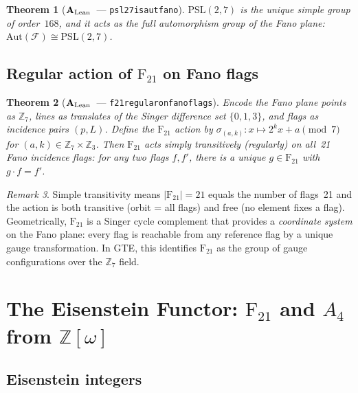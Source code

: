 \documentclass[11pt]{article}
\newtheorem{theorem}{Theorem}[section]
\theoremstyle{remark}
\newtheorem{remark}[theorem]{Remark}
\newcommand{\lean}[1]{%
  \penalty-100
  \begingroup\def\_{\textunderscore\allowbreak}\texttt{#1}\endgroup}
\newcommand{\PSLtwo}{\ensuremath{\mathrm{PSL}(2,7)}}
\newcommand{\FineSeven}{\ensuremath{\mathrm{F}_{21}}}
\newcommand{\Zcyc}[1]{\ensuremath{\mathbb{Z}_{#1}}}
\newcommand{\AltFour}{\ensuremath{A_4}}
\newcommand{\Eisenstein}{\ensuremath{\mathbb{Z}[\omega]}}
\newcommand{\CatAL}{\ensuremath{\textbf{A}_{\rm Lean}}}
\begin{document}
\begin{theorem}[\CatAL\ --- \lean{psl27\_is\_aut\_fano}]
\label{thm:psl_aut}
$\PSLtwo$ is the unique simple group of order~$168$, and it acts as the full
automorphism group of the Fano plane: $\mathrm{Aut}(\mathcal{F}) \cong \PSLtwo$.
\end{theorem}

\subsection{Regular action of \texorpdfstring{$\FineSeven$}{F21} on Fano flags}

\begin{theorem}[\CatAL\ --- \lean{f21\_regular\_on\_fano\_flags}]
\label{thm:flag_regular}
Encode the Fano plane points as $\mathbb{Z}_7$, lines as translates of the
Singer difference set $\{0,1,3\}$, and flags as incidence pairs $(p, L)$.
Define the $\FineSeven$ action by $\sigma_{(a,k)}: x \mapsto 2^k x + a
\pmod{7}$ for $(a,k) \in \Zcyc{7} \times \Zcyc{3}$.
Then $\FineSeven$ acts \emph{simply transitively} (regularly) on all~21
Fano incidence flags: for any two flags $f, f'$, there is a unique $g \in
\FineSeven$ with $g \cdot f = f'$.
\end{theorem}

\begin{remark}
Simple transitivity means $|\FineSeven| = 21$ equals the number of flags~21
and the action is both transitive (orbit = all flags) and free (no element
fixes a flag).
Geometrically, $\FineSeven$ is a Singer cycle complement that provides a
\emph{coordinate system} on the Fano plane: every flag is reachable from
any reference flag by a unique gauge transformation.
In GTE, this identifies $\FineSeven$ as the group of gauge configurations
over the $\mathbb{Z}_7$ field.
\end{remark}

\section{The Eisenstein Functor: \texorpdfstring{$\FineSeven$}{F21} and \texorpdfstring{$\AltFour$}{A4} from \texorpdfstring{$\Eisenstein$}{Z[omega]}}
\label{sec:eisenstein}

\subsection{Eisenstein integers}
\end{document}
